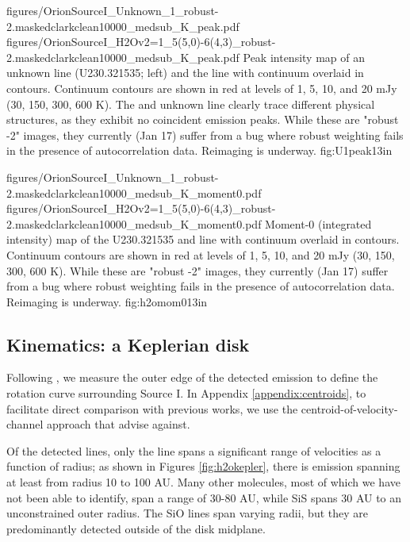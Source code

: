 \documentclass[twocolumn]{aastex61}
\begin{document}
\FigureTwo
{{figures/OrionSourceI_Unknown_1_robust-2.maskedclarkclean10000_medsub_K_peak}.pdf}
{{figures/OrionSourceI_H2Ov2=1_5(5,0)-6(4,3)_robust-2.maskedclarkclean10000_medsub_K_peak}.pdf}
{Peak intensity map of an unknown line (U230.321535; left) and the \water
line with continuum overlaid
in contours.
Continuum contours are shown in red at levels of 
1, 5, 10, and 20 mJy \perbeam (30, 150, 300, 600 K). %
The \water and unknown line clearly trace different physical structures, as
they exhibit no coincident emission peaks.
{\color{red} While these are "robust -2" images, they currently (Jan 17)
suffer from a bug where robust weighting fails in the presence of autocorrelation
data.  Reimaging is underway.}
}
{fig:U1peak}{1}{3in}

\FigureTwo
{{figures/OrionSourceI_Unknown_1_robust-2.maskedclarkclean10000_medsub_K_moment0}.pdf}
{{figures/OrionSourceI_H2Ov2=1_5(5,0)-6(4,3)_robust-2.maskedclarkclean10000_medsub_K_moment0}.pdf}
{Moment-0 (integrated intensity) map of the U230.321535 and \water line with continuum overlaid
in contours.
Continuum contours are shown in red at levels of 
1, 5, 10, and 20 mJy \perbeam (30, 150, 300, 600 K). %
{\color{red} While these are "robust -2" images, they currently (Jan 17)
suffer from a bug where robust weighting fails in the presence of autocorrelation
data.  Reimaging is underway.}
}
{fig:h2omom0}{1}{3in}

\subsection{Kinematics: a Keplerian disk}
\label{sec:kinematics}
Following \citet{Seifried2016a}, we measure the outer edge of the detected
\water emission to define the rotation curve surrounding Source I.  In Appendix
\ref{appendix:centroids}, to facilitate direct comparison with previous works,
we use the centroid-of-velocity-channel approach that \citet{Seifried2016a}
advise against.

Of the detected lines, only the \water line spans a significant range of
velocities as a function of radius; as shown in Figures \ref{fig:h2okepler},
there is \water emission spanning at least from radius 10 to 100 AU.  Many
other molecules, most of
which we have not been able to identify, span a range of 30-80 AU, while SiS
spans 30 AU to an unconstrained outer radius.   The SiO lines span varying radii,
but they are predominantly detected outside of the disk midplane.  
\end{document}
